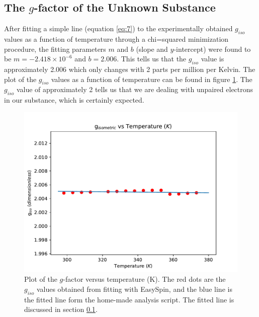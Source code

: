 \documentclass[twocolumn]{article}
\begin{document}
\subsection{The $g$-factor of the Unknown Substance}
\label{sec:Resultsgfact}
After fitting a simple line (equation \ref{eq:7}) to the experimentally obtained $g_{iso}$ values as a function of temperature through a chi=squared minimization procedure, the fitting parameters $m$ and $b$ (slope and $y$-intercept) were found to be $m=-2.418\times 10^{-6}$ and $b=2.006$. This tells us that the $g_{iso}$ value is approximately 2.006 which only changes with 2 parts per million per Kelvin. The plot of the $g_{iso}$ values as a function of temperature can be found in figure \ref{fig:fig2}. The $g_{iso}$ value of approximately 2 tells us that we are dealing with unpaired electrons in our substance, which is certainly expected. 
\begin{figure}[h]
	\includegraphics[scale=0.49]{g_iso_Plot}
	\caption{Plot of the $g$-factor versus temperature (\si{K}). The red dots are the $g_{iso}$ values obtained from fitting with EasySpin, and the blue line is the fitted line form the home-made analysis script. The fitted line is discussed in section \ref{sec:Resultsgfact}.\label{fig:fig2}}
\end{figure}
\end{document}
